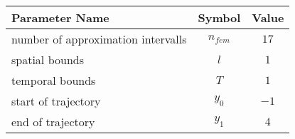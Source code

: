 \begin{tabular}{lcc}
\hline
 Parameter Name                     &  Symbol   &  Value  \\
\hline
 number of approximation intervalls & $n_{fem}$ &  $17$   \\
 spatial bounds                     &    $l$    &   $1$   \\
 temporal bounds                    &    $T$    &   $1$   \\
 start of trajectory                &  $y_{0}$  &  $-1$   \\
 end of trajectory                  &  $y_{1}$  &   $4$   \\
\hline
\end{tabular}
